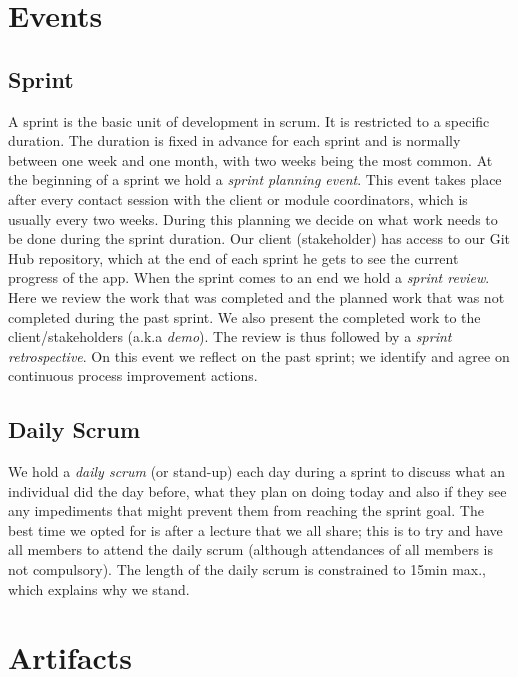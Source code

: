 \documentclass[hidelinks, 12pt, oneside]{article}
\begin{document}
	\section{Events}
	\subsection{Sprint}
	A sprint is the basic unit of development in scrum. It is restricted to a specific duration. The duration is fixed in advance for each sprint and is 
	normally between one week and one month, with two weeks being the most common.\newline\newline
	At the beginning of a sprint we hold a \emph{sprint planning event}. This event takes place after every contact session with the client or module coordinators,
	which is usually every two weeks. During this planning we decide on what work needs to be done during the sprint duration. Our client (stakeholder) has access 
	to our Git Hub repository, which at the end of each sprint he gets to see the current progress of the app.\newline
	When the sprint comes to an end we hold a \emph{sprint review}. Here we review the work that was completed and the planned work that was not completed during the 
	past sprint. We also present the completed work to the client/stakeholders (a.k.a \emph{demo}).\newline
	The review is thus followed by a \emph{sprint retrospective}. On this event we reflect on the past sprint; we identify and agree on continuous process improvement actions. 
	\subsection{Daily Scrum}
 	We hold a \emph{daily scrum} (or stand-up) each day during a sprint to discuss what an individual did the day before, what they plan on doing today and also if they 
 	see any impediments that might prevent them from reaching the sprint goal. The best time we opted for is after a lecture that we all share; this is to try and have 
 	all members	to attend the daily scrum (although attendances of all members is not compulsory). The length of the daily scrum is constrained to 15min max., which explains 
 	why we stand.\newpage 
 	
 	\section{Artifacts}
\end{document}
